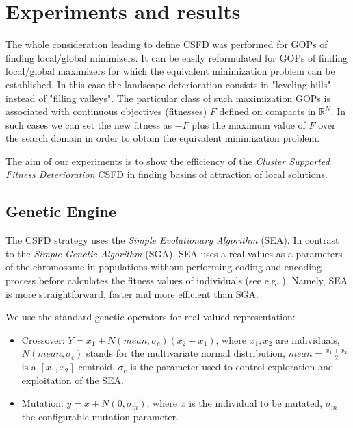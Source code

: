 
\chapter{Experiments and results}
\label{sec:testFun}

\vspace{5pt}
\begin{remark}
\label{rem:plusminus}
The whole consideration leading to define CSFD was performed for
GOPs of finding local/global minimizers.
It can be easily reformulated for GOPs of finding
local/global maximizers for which the equivalent minimization problem
can be established.
In this case the landscape deterioration consists in "leveling hills" 
instead of "filling valleys".
The particular class of such maximization GOPs is associated with continuous
objectives (fitnesses) $F$ defined on compacts in $\mathbb{R}^N$.
In such cases we can set the new fitness as $- F$ plus the maximum value 
of $F$ over the search domain
in order to obtain the equivalent minimization problem.
\end{remark}


The aim of our experiments is to show the efficiency of the 
\textit{Cluster Supported Fitness Deterioration} CSFD in finding 
basins of attraction of local solutions.


\section{Genetic Engine}
\label{sec:genEng}
The CSFD strategy uses the \textit{Simple Evolutionary Algorithm} (SEA).
In contrast to the \textit{Simple Genetic Algorithm} (SGA), 
SEA uses a real values as a parameters of the chromosome
in populations without performing coding and encoding
process before calculates the fitness values of individuals 
(see e.g. \cite{Schaefer2007}).
Namely, SEA is more straightforward, faster and more efficient than SGA.


We use the standard genetic operators for real-valued representation:
\begin{itemize}
  \item Crossover: $Y=x_1 + N(mean, \sigma_c)(x_2 - x_1)$, where $x_1, x_2$ are
  individuals, $N(mean, \sigma_c)$ stands for the multivariate normal
  distribution, $mean = \frac{x_1 + x_2}{2}$ is a $[x_1, x_2]$ centroid, 
  $\sigma_c$ is the parameter used to control exploration 
  and exploitation of the SEA.
  \item Mutation: $y = x + N(0, \sigma_m)$, where $x$ is the individual to be
  mutated, $\sigma_m$ the configurable mutation parameter.
\end{itemize}

